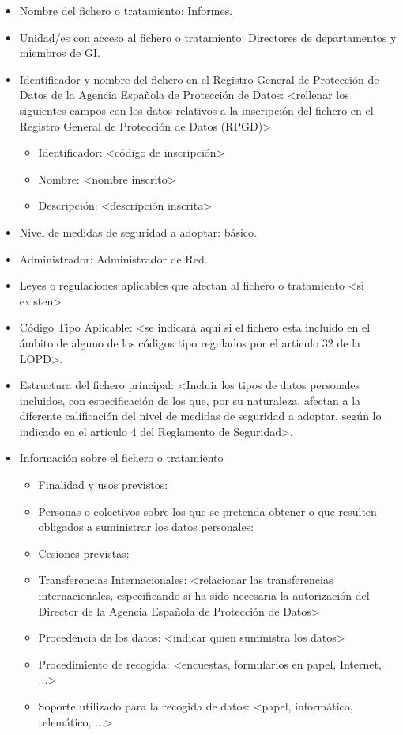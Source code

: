 \documentclass[a4paper,11pt,bibtotoc,noliststotoc]{scrbook}
\begin{document}
\begin{itemize}
\item Nombre del fichero o tratamiento: Informes.

\item Unidad/es con acceso al fichero o tratamiento: Directores de departamentos y miembros de GI.

\item Identificador y nombre del fichero en el Registro General de Protección de Datos de la Agencia Española de Protección de Datos: <rellenar los siguientes campos con los datos relativos a la inscripción del fichero en el Registro General de Protección de Datos (RPGD)>
	\begin{itemize}
	\item Identificador: <código de inscripción>
	\item Nombre: <nombre inscrito>
	\item Descripción: <descripción inscrita>
	\end{itemize}

\item Nivel de medidas de seguridad a adoptar: básico.

\item Administrador: Administrador de Red.

\item Leyes o regulaciones aplicables que afectan al fichero o tratamiento <si existen>

\item Código Tipo Aplicable: <se indicará aquí si el fichero esta incluido en el ámbito de alguno de los códigos tipo regulados por el articulo 32 de la LOPD>.

\item Estructura del fichero principal: <Incluir los tipos de datos personales incluidos, con especificación de los que, por su naturaleza, afectan a la diferente calificación del nivel de medidas de seguridad a adoptar, según lo indicado en el artículo 4 del Reglamento de Seguridad>.

\item Información sobre el fichero o tratamiento
	\begin{itemize}
	\item Finalidad y usos previstos:
	\item Personas o colectivos sobre los que se pretenda obtener o que resulten obligados a suministrar los datos personales:
	\item Cesiones previstas:
	\item Transferencias Internacionales: <relacionar las transferencias internacionales, especificando si ha sido necesaria la autorización del Director de la Agencia Española de Protección de Datos>
	\item Procedencia de los datos: <indicar quien suministra los datos>
	\item Procedimiento de recogida: <encuestas, formularios en papel, Internet, ...>
	\item Soporte utilizado para la recogida de datos: <papel, informático, telemático, ...>
	\end{itemize}


\end{itemize}
\end{document}
